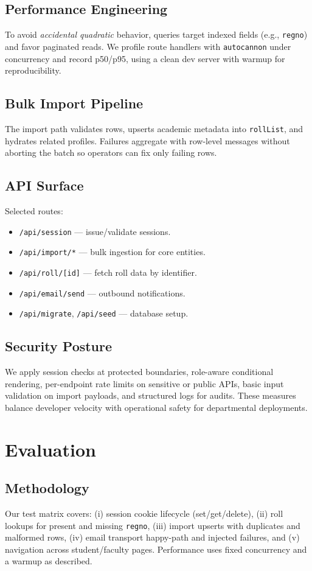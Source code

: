 \documentclass[conference]{IEEEtran}
\begin{document}
\subsection{Performance Engineering}
To avoid \emph{accidental quadratic} behavior, queries target indexed fields (e.g., \texttt{regno}) and favor paginated reads. We profile route handlers with \texttt{autocannon} under concurrency and record p50/p95, using a clean dev server with warmup for reproducibility.

\subsection{Bulk Import Pipeline}
The import path validates rows, upserts academic metadata into \texttt{rollList}, and hydrates related profiles. Failures aggregate with row-level messages without aborting the batch so operators can fix only failing rows.

\subsection{API Surface}
Selected routes:
\begin{itemize}[leftmargin=*,nosep]
  \item \texttt{/api/session} — issue/validate sessions.
  \item \texttt{/api/import/*} — bulk ingestion for core entities.
  \item \texttt{/api/roll/[id]} — fetch roll data by identifier.
  \item \texttt{/api/email/send} — outbound notifications.
  \item \texttt{/api/migrate}, \texttt{/api/seed} — database setup.
\end{itemize}

\subsection{Security Posture}
We apply session checks at protected boundaries, role-aware conditional rendering, per-endpoint rate limits on sensitive or public APIs, basic input validation on import payloads, and structured logs for audits. These measures balance developer velocity with operational safety for departmental deployments.

\section{Evaluation}
\subsection{Methodology}
Our test matrix covers: (i) session cookie lifecycle (set/get/delete), (ii) roll lookups for present and missing \texttt{regno}, (iii) import upserts with duplicates and malformed rows, (iv) email transport happy-path and injected failures, and (v) navigation across student/faculty pages. Performance uses fixed concurrency and a warmup as described.
\end{document}

